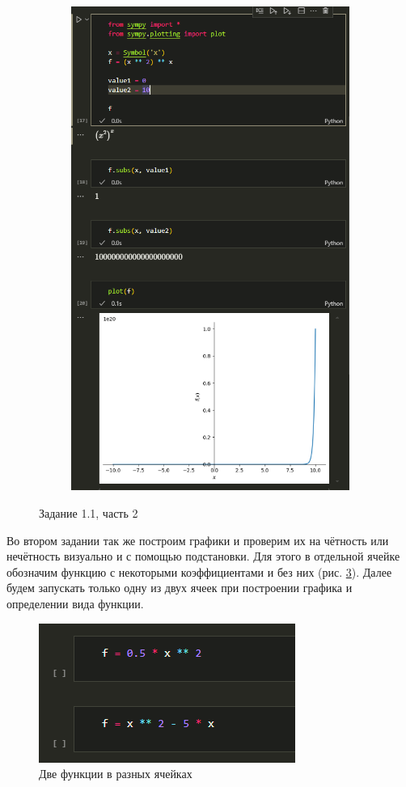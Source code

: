 \documentclass[14pt,a4paper]{extarticle}
\begin{document}
\begin{figure}[h!]
\begin{subfigure}{.5\textwidth}
        \includegraphics[width=0.9\linewidth]{figures/inftech/lab1/1.1 (4).png}
        \label{fig:1.1(4)}
    \end{subfigure}
    \caption{Задание 1.1, часть 2}
    \label{fig:1.1-part2}
\end{figure}

Во втором задании так же построим графики и проверим их на чётность
или нечётность визуально и с помощью подстановки. Для этого в отдельной
ячейке обозначим функцию с некоторыми коэффициентами и без них (рис. \ref{fig:1.2-2funcs}).
Далее будем запускать только одну из двух ячеек при построении графика и
определении вида функции.

\begin{figure}[h!]
    \centering
    \includegraphics[width=0.5\linewidth]{figures//inftech//lab1/2 functions.png}
    \caption{Две функции в разных ячейках}
    \label{fig:1.2-2funcs}
\end{figure}
\end{document}
